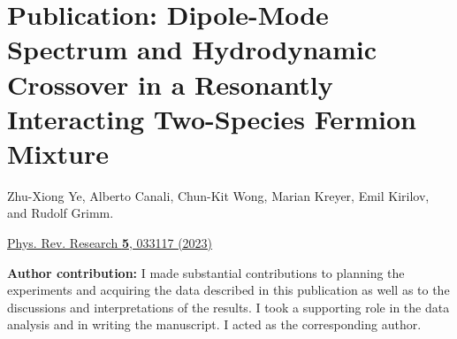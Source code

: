 \chapter{Publication: Dipole-Mode Spectrum and Hydrodynamic Crossover in a Resonantly Interacting Two-Species Fermion Mixture}
\label{Chpt:DipoleandHydro}

\begin{flushleft}
	\noindent
	
	{\Large Zhu-Xiong Ye, Alberto Canali, Chun-Kit Wong, Marian Kreyer, Emil Kirilov, and Rudolf Grimm.\linebreak}
	
	{\Large\href{https://doi.org/10.1103/PhysRevResearch.7.023259}{Phys. Rev. Research  \textbf{5}, 033117 (2023)}\linebreak}
	
	
	\vfill
	
	\noindent
	{\large \textbf{Author contribution:}}
	I  made substantial contributions to planning the experiments and acquiring the data described in this publication as well as to the discussions and interpretations of the results. I took a supporting role in the data analysis and in writing the manuscript. I acted as the corresponding author. \linebreak
	\noindent
	
	
\end{flushleft}

